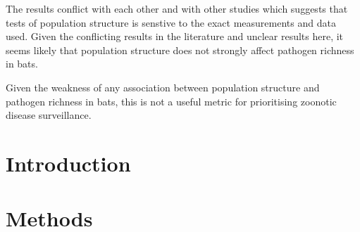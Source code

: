 The results conflict with each other and with other studies which suggests that tests of population structure is senstive to the exact measurements and data used.
Given the conflicting results in the literature and unclear results here, it seems likely that population structure does not strongly affect pathogen richness in bats.


Given the weakness of any association between population structure and pathogen richness in bats, this is not a useful metric for prioritising zoonotic disease surveillance.







\clearpage
\section{Introduction}


\subsection{}





\section{Methods}

